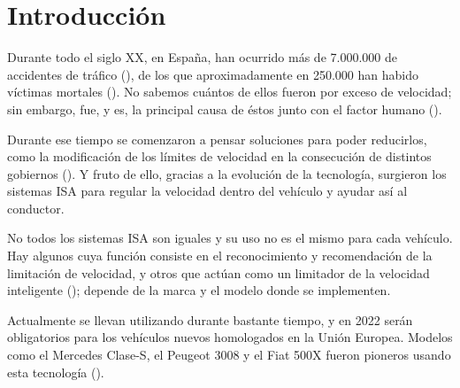 
\chapter{Introducción} 


Durante todo el siglo XX, en España, han ocurrido más de 7.000.000 de accidentes de tráfico (\cite{sigloXX}), de los que aproximadamente en 250.000 han habido víctimas mortales (\cite{vidas}). No sabemos cuántos de ellos fueron por exceso de velocidad; sin embargo, fue, y es, la principal causa de éstos junto con el factor humano (\cite{dgt-velocidad}). 

Durante ese tiempo se comenzaron a pensar soluciones para poder reducirlos, como la modificación de los límites de velocidad en la consecución de distintos gobiernos (\cite{limites-velocidad}). Y fruto de ello, gracias a la evolución de la tecnología, surgieron los sistemas \ac{ISA} para regular la velocidad dentro del vehículo y ayudar así al conductor.

No todos los sistemas \ac{ISA} son iguales y su uso no es el mismo para cada vehículo. Hay algunos cuya función consiste en el reconocimiento y recomendación de la limitación de velocidad, y otros que actúan como un limitador de la velocidad inteligente (\cite{2022}); depende de la marca y el modelo donde se implementen.

Actualmente se llevan utilizando durante bastante tiempo, y en 2022 serán obligatorios para los vehículos nuevos homologados en la Unión Europea. Modelos como el Mercedes Clase-S, el Peugeot 3008 y el Fiat 500X fueron pioneros usando esta tecnología (\cite{2022}).




